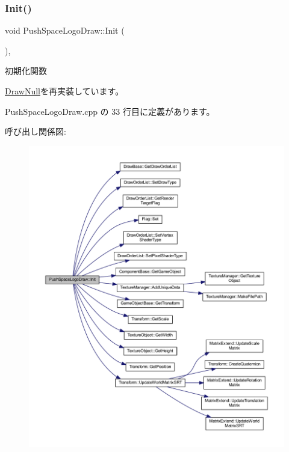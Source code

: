\subsubsection{\texorpdfstring{Init()}{Init()}}
{\footnotesize\ttfamily void Push\+Space\+Logo\+Draw\+::\+Init (\begin{DoxyParamCaption}{ }\end{DoxyParamCaption})\hspace{0.3cm}{\ttfamily [override]}, {\ttfamily [virtual]}}



初期化関数 



\mbox{\hyperlink{class_draw_null_acd7fef3ccea1da537ac9507ffbb6dd2e}{Draw\+Null}}を再実装しています。



 Push\+Space\+Logo\+Draw.\+cpp の 33 行目に定義があります。

呼び出し関係図\+:\nopagebreak
\begin{figure}[H]
\begin{center}
\leavevmode
\includegraphics[width=350pt]{class_push_space_logo_draw_a7ad3fe53d9bda4ea16c958bc102ff54e_cgraph}
\end{center}
\end{figure}
\mbox{\label{class_push_space_logo_draw_a79021c1df43968d6008de74126d53fba}} 
